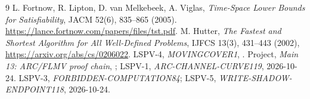 \documentclass[11pt]{article}
\begin{document}
\begin{thebibliography}{9}
 L. Fortnow, R. Lipton, D. van Melkebeek, A. Viglas, \emph{Time-Space Lower Bounds for Satisfiability}, JACM 52(6), 835--865 (2005).
\url{https://lance.fortnow.com/papers/files/tst.pdf}.
 M. Hutter, \emph{The Fastest and Shortest Algorithm for All Well-Defined Problems}, IJFCS 13(3), 431--443 (2002), \url{https://arxiv.org/abs/cs/0206022}.
 LSPV-4, \emph{MOVINGCOVER1}, .
 Project, \emph{Main 13: ARC/FLMV proof chain}, ; LSPV-1, \emph{ARC-CHANNEL-CURVE119}, 2026-10-24.
 LSPV-3, \emph{FORBIDDEN-COMPUTATION84}; LSPV-5, \emph{WRITE-SHADOW-ENDPOINT118}, 2026-10-24.
\end{thebibliography}
\end{document}
